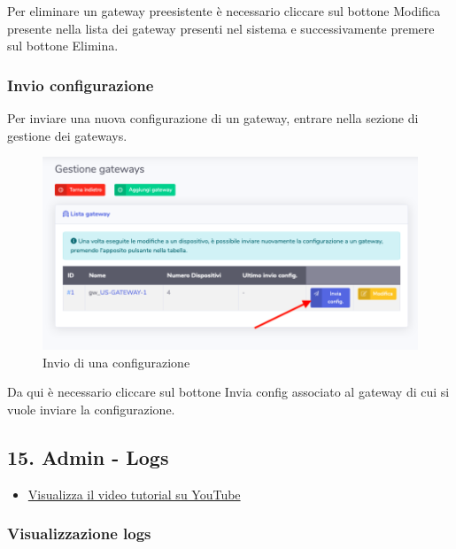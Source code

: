 		Per eliminare un gateway preesistente è necessario cliccare sul bottone Modifica presente nella lista dei gateway presenti nel sistema e successivamente premere sul bottone Elimina.

	\subsubsection{Invio configurazione}

		Per inviare una nuova configurazione di un gateway, entrare nella sezione di gestione dei gateways.

		\begin{figure}[H]
		\centering
		\includegraphics[scale=0.600]{res/images/admin/inviaConfig.png}
		\caption{Invio di una configurazione}
	\end{figure}

		Da qui è necessario cliccare sul bottone Invia config associato al gateway di cui si vuole inviare la configurazione.


\newpage \subsection{15. Admin - Logs}

	\begin{itemize}
		\item \href{https://www.youtube.com/watch?v=PjySMOLCtMA&list=PLPKYjnuIh1FA3b3jn_bwY_ztYzaFn2mIT&index=18}{Visualizza il video tutorial su YouTube} 
	\end{itemize}
	
	\subsubsection{Visualizzazione logs}

